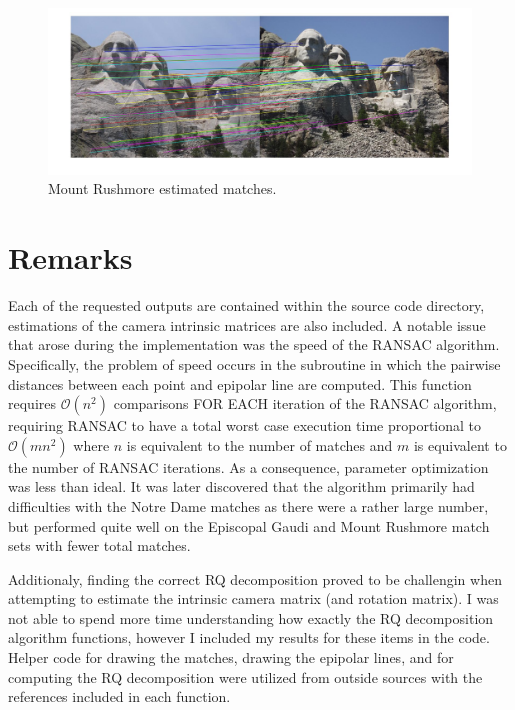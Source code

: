 \documentclass{article}
\begin{document}
\begin{center}
\begin{figure}[H]
			\includegraphics[scale = 0.25]{mount_rushmore_estimated_matches.jpg}
\caption{Mount Rushmore estimated matches.}
\end{figure}
\end{center}

	\section{Remarks}
	Each of the requested outputs are contained within the source code directory, estimations of the camera intrinsic matrices are also included. 
		A notable issue that arose during the implementation was the speed of the RANSAC algorithm. Specifically, the problem of speed occurs in the subroutine in which the pairwise distances between each point and epipolar line are computed. This function requires $\mathcal{O}(n^{2})$ comparisons FOR EACH iteration of the RANSAC algorithm, requiring RANSAC to have a total worst case execution time proportional to $\mathcal{O}(mn^{2})$ where $n$ is equivalent to the number of matches and $m$ is equivalent to the number of RANSAC iterations. As a consequence, parameter optimization was less than ideal. It was later discovered that the algorithm primarily had difficulties with the Notre Dame matches as there were a rather large number, but performed quite well on the Episcopal Gaudi and Mount Rushmore match sets with fewer total matches.

		Additionaly, finding the correct RQ decomposition proved to be challengin when attempting to estimate the intrinsic camera matrix (and rotation matrix). I was not able to spend more time understanding how exactly the RQ decomposition algorithm functions, however I included my results for these items in the code.
		Helper code for drawing the matches, drawing the epipolar lines, and for computing the RQ decomposition were utilized from outside sources with the references included in each function.
\end{document}
